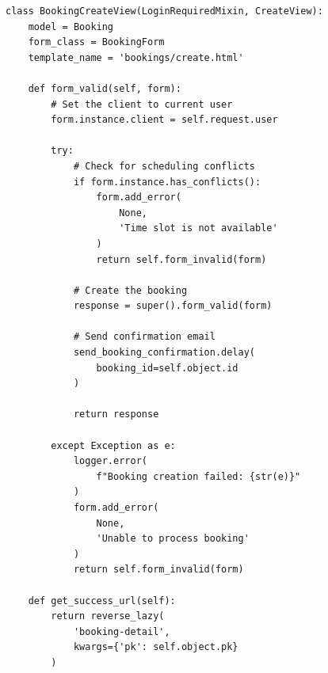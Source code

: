 \begin{tcolorbox}[
    enhanced,
    title={Django View Example},
    attach boxed title to top left,
    boxed title style={
        colback=info!50,
        colframe=info!50,
        arc=0mm,
    },
    colback=white,
    colframe=info!50,
    arc=0mm,
    fonttitle=\bfseries
]
    \begin{verbatim}
class BookingCreateView(LoginRequiredMixin, CreateView):
    model = Booking
    form_class = BookingForm
    template_name = 'bookings/create.html'
    
    def form_valid(self, form):
        # Set the client to current user
        form.instance.client = self.request.user
        
        try:
            # Check for scheduling conflicts
            if form.instance.has_conflicts():
                form.add_error(
                    None, 
                    'Time slot is not available'
                )
                return self.form_invalid(form)
            
            # Create the booking
            response = super().form_valid(form)
            
            # Send confirmation email
            send_booking_confirmation.delay(
                booking_id=self.object.id
            )
            
            return response
            
        except Exception as e:
            logger.error(
                f"Booking creation failed: {str(e)}"
            )
            form.add_error(
                None,
                'Unable to process booking'
            )
            return self.form_invalid(form)
    
    def get_success_url(self):
        return reverse_lazy(
            'booking-detail',
            kwargs={'pk': self.object.pk}
        )
    \end{verbatim}
\end{tcolorbox}

